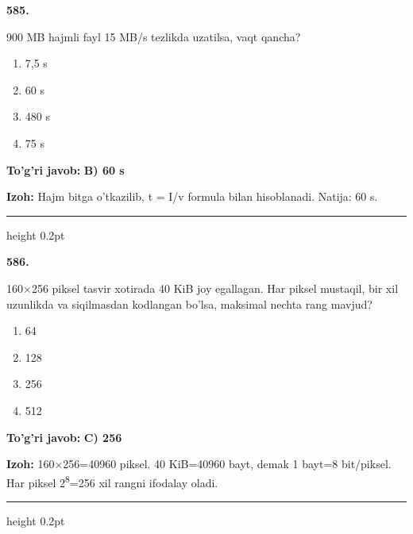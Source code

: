 \documentclass[10pt,a4paper,oneside]{article}
\begin{document}
\noindent\textbf{\color{ink}585.}
\par
900 MB hajmli fayl 15 MB/s tezlikda uzatilsa, vaqt qancha?
\begin{enumerate}[label=\Alph*),leftmargin=9mm]
\item 7,5 s
\item 60 s
\item 480 s
\item 75 s
\end{enumerate}
\begin{tcolorbox}[enhanced,breakable,colback=teal!4,colframe=teal!50!black,boxrule=0.5pt,arc=1.1mm,left=3mm,right=3mm,top=1.7mm,bottom=1.7mm,before skip=2mm,after skip=2mm]
\textbf{\color{teal}To'g'ri javob:} \textbf{B) 60 s}
\par\smallskip
\textbf{Izoh:} Hajm bitga o'tkazilib, t = I/v formula bilan hisoblanadi. Natija: 60 s.
\end{tcolorbox}
\vspace{2mm}\hrule height 0.2pt \vspace{3mm}

\noindent\textbf{\color{ink}586.}
\par
160\ensuremath{\times}256 piksel tasvir xotirada 40 KiB joy egallagan. Har piksel mustaqil, bir xil uzunlikda va siqilmasdan kodlangan bo'lsa, maksimal nechta rang mavjud?
\begin{enumerate}[label=\Alph*),leftmargin=9mm]
\item 64
\item 128
\item 256
\item 512
\end{enumerate}
\begin{tcolorbox}[enhanced,breakable,colback=teal!4,colframe=teal!50!black,boxrule=0.5pt,arc=1.1mm,left=3mm,right=3mm,top=1.7mm,bottom=1.7mm,before skip=2mm,after skip=2mm]
\textbf{\color{teal}To'g'ri javob:} \textbf{C) 256}
\par\smallskip
\textbf{Izoh:} 160\ensuremath{\times}256=40960 piksel. 40 KiB=40960 bayt, demak 1 bayt=8 bit/piksel. Har piksel 2\textsuperscript{8}=256 xil rangni ifodalay oladi.
\end{tcolorbox}
\vspace{2mm}\hrule height 0.2pt \vspace{3mm}
\end{document}
